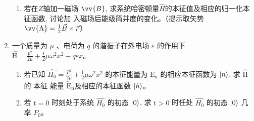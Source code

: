 \begin{enumerate}
\begin{enumerate}
	\item 
	若在$ Z $轴加一磁场 $  \vv{B}  $, 求系统哈密顿量$ \hat{H} $的本征值及相应的归一化本征函数, 讨论加
	入磁场后能级简并度的变化。（提示取矢势$ \vv{\mathrm{A}}=\frac{1}{2} \vec{B} \times \vec{r} $）
	
	
\end{enumerate}



\item 
一个质量为 $\mu$ 、电荷为 $q$ 的谐振子在外电场 $\varepsilon$ 的作用下 $ \hat{ \mathrm{H}}=\frac{p^{2}}{2 \mu}+\frac{1}{2} \mu \omega^{2} x^{2}-q \varepsilon x $。
\begin{enumerate}
	\item
	若已知 $\hat{H_{0}}=\frac{P^{2}}{2 \mu}+\frac{1}{2} \mu \omega^{2} x^{2}$ 的本征能量为 $\mathrm{E}_{\mathrm{n}}$ 的相应本征函数为 $ \ket{n} $, 求 $\hat{\mathrm{H}}$ 的  本征
	能量 $\widetilde{\mathrm{E}}_{\mathrm{n}}$及相应的本征函数 $ \ket{\tilde{n}} $。
	\item 
	若 $\mathrm{t}=0$ 时刻处于系统 $\hat{H_{0}}$ 的初态 $ \ket{0} $, 求 $\mathrm{t}>0$ 时任处 $\hat{H_{0}}$ 的初态 $ \ket{0} $ 几率 $P_{0}$。
	

\end{enumerate}
\end{enumerate}
